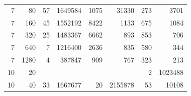 \begin{table}[p]
\begin{minipage}[c]{0.49\textwidth}
\begin{tabular}{|rr|rr|rr|rr|}
\num{7} &   \num{80} & \num{57} &  \num{1649584} & \num{1075} &    \num{31330} & \num{273} &  \num{3701} \\
\num{7} &  \num{160} & \num{45} &  \num{1552192} & \num{8422} &     \num{1133} & \num{675} &  \num{1084} \\
\num{7} &  \num{320} & \num{25} &  \num{1483367} & \num{6662} &      \num{893} & \num{853} &   \num{706} \\
\num{7} &  \num{640} &  \num{7} &  \num{1216400} & \num{2636} &      \num{835} & \num{580} &   \num{344} \\
\num{7} & \num{1280} &  \num{4} &   \num{387847} &  \num{909} &      \num{767} & \num{323} &   \num{213} \\
\hline
\num{10} &   \num{20} &          &               &            &               &   \num{2} & \num{1023488} \\
\num{10} &   \num{40} & \num{33} & \num{1667677} &   \num{20} & \num{2155878} &  \num{53} &   \num{10108} \\

\end{tabular}
\end{minipage}
\end{table}

